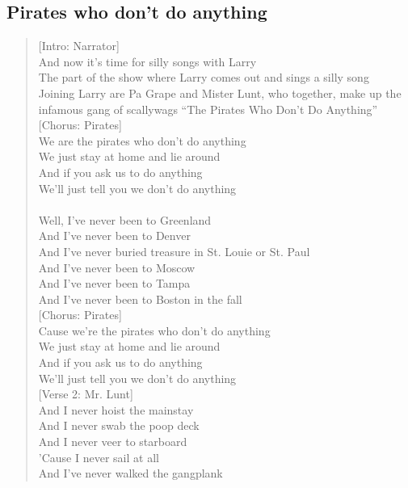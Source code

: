 \documentclass[11pt]{article}
\begin{document}
\subsection{Pirates who don't do anything}
\label{sec:org7bfcb92}
\begin{verse}
[Intro: Narrator]\\
And now it's time for silly songs with Larry\\
The part of the show where Larry comes out and sings a silly song\\
\vspace*{1em}
Joining Larry are Pa Grape and Mister Lunt, who together, make up the infamous gang of scallywags ``The Pirates Who Don't Do Anything''\\
\vspace*{1em}
[Chorus: Pirates]\\
We are the pirates who don't do anything\\
We just stay at home and lie around\\
And if you ask us to do anything\\
We'll just tell you we don't do anything\\
[Verse 1: Pa Grape]\\
Well, I've never been to Greenland\\
And I've never been to Denver\\
And I've never buried treasure in St. Louie or St. Paul\\
And I've never been to Moscow\\
And I've never been to Tampa\\
And I've never been to Boston in the fall\\
\vspace*{1em}
[Chorus: Pirates]\\
Cause we're the pirates who don't do anything\\
We just stay at home and lie around\\
And if you ask us to do anything\\
We'll just tell you we don't do anything\\
\vspace*{1em}
[Verse 2: Mr. Lunt]\\
And I never hoist the mainstay\\
And I never swab the poop deck\\
And I never veer to starboard\\
'Cause I never sail at all\\
And I've never walked the gangplank\\

\end{verse}
\end{document}
